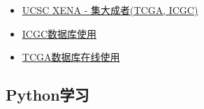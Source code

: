 \documentclass[]{article}
\providecommand{\tightlist}{%
  \setlength{\itemsep}{0pt}\setlength{\parskip}{0pt}}
\numberwithin{figure}{section}
\numberwithin{table}{section}
\theoremstyle{definition}
\theoremstyle{definition}
\theoremstyle{definition}
\theoremstyle{remark}
\begin{document}
\begin{itemize}
\tightlist
\item
  \href{http://mp.weixin.qq.com/s?__biz=MzI5MTcwNjA4NQ==\&mid=2247484383\&idx=1\&sn=09c58de206f409fa375fb7af94d0084c\&chksm=ec0dc655db7a4f438cb7e53f281cb5c6bf2484619b3c72d7eafe064ea6a342f69587353531af\#rd}{UCSC
  XENA - 集大成者(TCGA, ICGC)}
\item
  \href{http://mp.weixin.qq.com/s?__biz=MzI5MTcwNjA4NQ==\&mid=2247484378\&idx=1\&sn=eb6a0f890326898b2fb0867c58f0cf90\&chksm=ec0dc650db7a4f46a0a265ec96b73f367d45f86318087507eef7dde117a369cb7ad427bebb1e\#rd}{ICGC数据库使用}
\item
  \href{http://mp.weixin.qq.com/s?__biz=MzI5MTcwNjA4NQ==\&mid=2247484304\&idx=1\&sn=6ad44dafdc7613e33e13aac48edb32aa\&chksm=ec0dc61adb7a4f0c504f3aeb207132aef479572ea756ce15868cbc57f88e9ea25102752b646a\#rd}{TCGA数据库在线使用}
\end{itemize}

\subsection{Python学习}\label{python}
\end{document}
